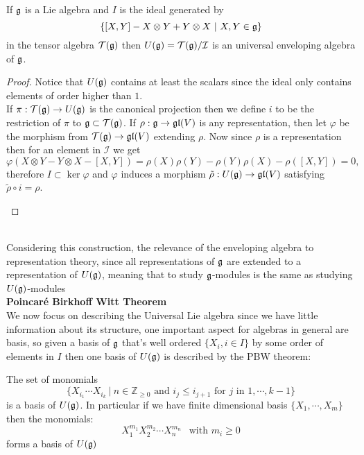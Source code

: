 \begin{prop}
	If $\mathfrak{g}$ is a Lie algebra and $I$ is the ideal generated by $$\{[X,Y]-X\otimes Y + Y \otimes X \ | \ X,Y \in \mathfrak{g}\}$$ in the tensor algebra $\mathcal{T}(\mathfrak{g})$ then $U(\mathfrak{g})=\mathcal{T}(\mathfrak{g})/\mathcal{I}$ is an universal enveloping algebra of $\mathfrak{g}$.
\end{prop}
\begin{proof}
	Notice that $U(\mathfrak{g})$ contains at least the scalars since the ideal only contains elements of order higher than $1$.\\
	If $\pi : \mathcal{T}(\mathfrak{g}) \rightarrow U(\mathfrak{g})$ is the canonical projection then we define $i$ to be the restriction of $\pi$ to $\mathfrak{g} \subset \mathcal{T}(\mathfrak{g})$.
	If $\rho: \mathfrak{g} \rightarrow \mathfrak{gl}(V)$ is any representation, then let $\varphi$ be the morphism from $\mathcal{T}(\mathfrak{g}) \rightarrow \mathfrak{gl}(V)$ extending $\rho$. Now since $\rho$ is a representation then for an element in $\mathcal{I}$ we get
	$$ \varphi(X \otimes Y - Y \otimes X - [X,Y])= \rho(X)\rho(Y) - \rho(Y)\rho(X) - \rho([X,Y])=0,$$
	therefore $I \subset \ker \varphi$ and $\varphi$ induces a morphism $\tilde{\rho}:U(\mathfrak{g})\rightarrow \mathfrak{gl}(V)$ satisfying $ \tilde{\rho} \circ i = \rho$.
	\begin{center}
	\end{center}
\end{proof}\\
Considering this construction, the relevance of the enveloping algebra to representation theory, since all representations of $\mathfrak{g}$ are extended to a representation of $U(\mathfrak{g})$, meaning that to study $\mathfrak{g}$-modules is the same as studying $U(\mathfrak{g})$-modules\\
\newpage
\textbf{Poincaré Birkhoff Witt Theorem}\\
We now focus on describing the Universal Lie algebra since we have little information about its structure, one important aspect for algebras in general are basis, so given a basis of $\mathfrak{g}$ that's well ordered $\{X_i, i \in I\}$ by some order of elements in $I$ then one basis of $U(\mathfrak{g})$ is described by the PBW theorem:\\
\begin{teo}
	The set of monomials $$\{X_{i_1} \cdots X_{i_k} \ | \ n \in \mathbb{Z}_{\ge{0}} \text { and } i_j \le i_{j+1} \text{ for $j$ in } 1,\cdots,k-1\}$$ is a basis of $U(\mathfrak{g})$. In particular if we have finite dimensional basis $\{X_1,\cdots,X_m\}$ then the monomials:
	$$ X_1^{m_1}X_2^{m_2}\cdots X_n^{m_n} \ \ \text{ with } m_i\ge0$$
	forms a basis of $U(\mathfrak{g})$
	\label{41PBWProof}
\end{teo}
